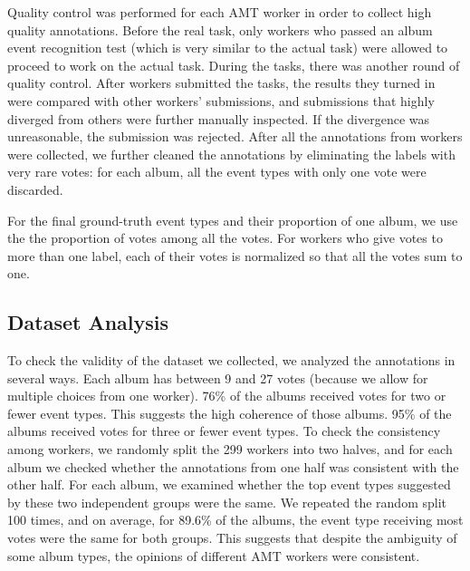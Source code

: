 \documentclass[runningheads]{llncs}
\begin{document}
Quality control was performed for each AMT worker in order to collect high quality annotations. Before the real task, only workers who passed an album event recognition test (which is very similar to the actual task) were allowed to proceed to work on the actual task. During the tasks, there was another round of quality control. After workers submitted the tasks, the results they turned in were compared with other workers' submissions, and submissions that highly diverged from others were further manually inspected. If the divergence was unreasonable, the submission was rejected. After all the annotations from workers were collected, we further cleaned the annotations by eliminating the labels with very rare votes: for each album, all the event types with only one vote were discarded. 
%
%
%
%
%
%

For the final ground-truth event types and their proportion of one album, we use the the proportion of votes among all the votes. For workers who give votes to more than one label, each of their votes is normalized so that all the votes sum to one.
%
%
%

\subsection{Dataset Analysis}
To check the validity of the dataset we collected, we analyzed the annotations in several ways. Each album has between 9 and 27 votes (because we allow for multiple choices from one worker). 76\% of the albums received votes for two or fewer event types. This suggests the high coherence of those albums. 95\% of the albums received votes for three or fewer event types.  To check the consistency among workers, we randomly split the 299 workers into two halves, and for each album we checked whether the annotations from one half was consistent with the other half. For each album, we examined whether the top event types suggested by these two independent groups were the same.
%
%
%
We repeated the random split 100 times, and on average, for 89.6\% of the albums, the event type receiving most votes were the same for both groups. This suggests that despite the ambiguity of some album types, the opinions of different AMT workers were consistent.
\end{document}
